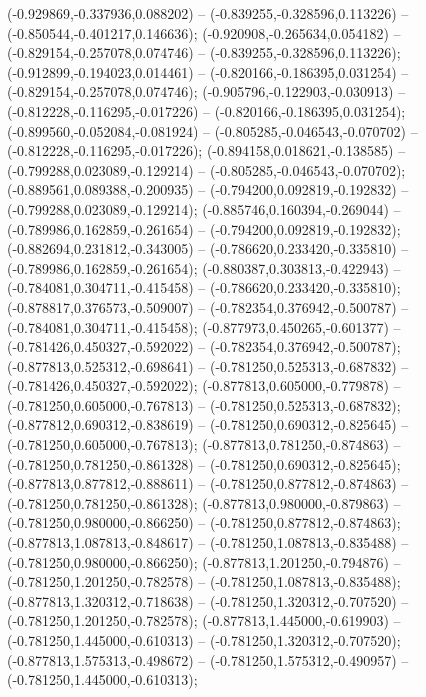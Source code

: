  (-0.929869,-0.337936,0.088202) -- (-0.839255,-0.328596,0.113226) -- (-0.850544,-0.401217,0.146636);
 (-0.920908,-0.265634,0.054182) -- (-0.829154,-0.257078,0.074746) -- (-0.839255,-0.328596,0.113226);
 (-0.912899,-0.194023,0.014461) -- (-0.820166,-0.186395,0.031254) -- (-0.829154,-0.257078,0.074746);
 (-0.905796,-0.122903,-0.030913) -- (-0.812228,-0.116295,-0.017226) -- (-0.820166,-0.186395,0.031254);
 (-0.899560,-0.052084,-0.081924) -- (-0.805285,-0.046543,-0.070702) -- (-0.812228,-0.116295,-0.017226);
 (-0.894158,0.018621,-0.138585) -- (-0.799288,0.023089,-0.129214) -- (-0.805285,-0.046543,-0.070702);
 (-0.889561,0.089388,-0.200935) -- (-0.794200,0.092819,-0.192832) -- (-0.799288,0.023089,-0.129214);
 (-0.885746,0.160394,-0.269044) -- (-0.789986,0.162859,-0.261654) -- (-0.794200,0.092819,-0.192832);
 (-0.882694,0.231812,-0.343005) -- (-0.786620,0.233420,-0.335810) -- (-0.789986,0.162859,-0.261654);
 (-0.880387,0.303813,-0.422943) -- (-0.784081,0.304711,-0.415458) -- (-0.786620,0.233420,-0.335810);
 (-0.878817,0.376573,-0.509007) -- (-0.782354,0.376942,-0.500787) -- (-0.784081,0.304711,-0.415458);
 (-0.877973,0.450265,-0.601377) -- (-0.781426,0.450327,-0.592022) -- (-0.782354,0.376942,-0.500787);
 (-0.877813,0.525312,-0.698641) -- (-0.781250,0.525313,-0.687832) -- (-0.781426,0.450327,-0.592022);
 (-0.877813,0.605000,-0.779878) -- (-0.781250,0.605000,-0.767813) -- (-0.781250,0.525313,-0.687832);
 (-0.877812,0.690312,-0.838619) -- (-0.781250,0.690312,-0.825645) -- (-0.781250,0.605000,-0.767813);
 (-0.877813,0.781250,-0.874863) -- (-0.781250,0.781250,-0.861328) -- (-0.781250,0.690312,-0.825645);
 (-0.877813,0.877812,-0.888611) -- (-0.781250,0.877812,-0.874863) -- (-0.781250,0.781250,-0.861328);
 (-0.877813,0.980000,-0.879863) -- (-0.781250,0.980000,-0.866250) -- (-0.781250,0.877812,-0.874863);
 (-0.877813,1.087813,-0.848617) -- (-0.781250,1.087813,-0.835488) -- (-0.781250,0.980000,-0.866250);
 (-0.877813,1.201250,-0.794876) -- (-0.781250,1.201250,-0.782578) -- (-0.781250,1.087813,-0.835488);
 (-0.877813,1.320312,-0.718638) -- (-0.781250,1.320312,-0.707520) -- (-0.781250,1.201250,-0.782578);
 (-0.877813,1.445000,-0.619903) -- (-0.781250,1.445000,-0.610313) -- (-0.781250,1.320312,-0.707520);
 (-0.877813,1.575313,-0.498672) -- (-0.781250,1.575312,-0.490957) -- (-0.781250,1.445000,-0.610313);
